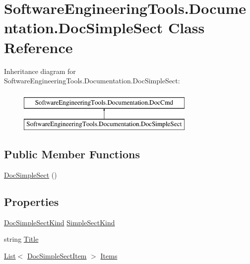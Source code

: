 \hypertarget{class_software_engineering_tools_1_1_documentation_1_1_doc_simple_sect}{\section{Software\+Engineering\+Tools.\+Documentation.\+Doc\+Simple\+Sect Class Reference}
\label{class_software_engineering_tools_1_1_documentation_1_1_doc_simple_sect}
}
Inheritance diagram for Software\+Engineering\+Tools.\+Documentation.\+Doc\+Simple\+Sect\+:\begin{figure}[H]
\begin{center}
\leavevmode
\includegraphics[height=2.000000cm]{class_software_engineering_tools_1_1_documentation_1_1_doc_simple_sect}
\end{center}
\end{figure}
\subsection*{Public Member Functions}
\begin{DoxyCompactItemize}
\item 
\hyperlink{class_software_engineering_tools_1_1_documentation_1_1_doc_simple_sect_a0a6d8e79010d9e03c6319fef6e08aff7}{Doc\+Simple\+Sect} ()
\end{DoxyCompactItemize}
\subsection*{Properties}
\begin{DoxyCompactItemize}
\item 
\hyperlink{namespace_software_engineering_tools_1_1_documentation_afbf354018df4b51c4b26a5cd7182555d}{Doc\+Simple\+Sect\+Kind} \hyperlink{class_software_engineering_tools_1_1_documentation_1_1_doc_simple_sect_a6a4b4036b16ccfb60f48c5e7df50ac40}{Simple\+Sect\+Kind}
\item 
string \hyperlink{class_software_engineering_tools_1_1_documentation_1_1_doc_simple_sect_a1315d0d038a955a9ba38da4d299f05e2}{Title}
\item 
\hyperlink{namespace_software_engineering_tools_1_1_documentation_ae0bccf4f49a76db084c1c316e5954ec9a4ee29ca12c7d126654bd0e5275de6135}{List}$<$ \hyperlink{class_software_engineering_tools_1_1_documentation_1_1_doc_simple_sect_item}{Doc\+Simple\+Sect\+Item} $>$ \hyperlink{class_software_engineering_tools_1_1_documentation_1_1_doc_simple_sect_ab7d54f32f51a5ee11242cd37f1bd39dc}{Items}
\end{DoxyCompactItemize}


